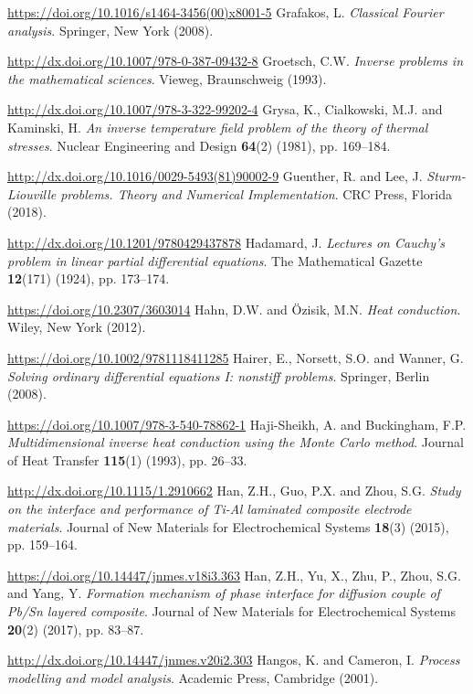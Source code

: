\begin{thebibliography}{301}
\url{https://doi.org/10.1016/s1464-3456(00)x8001-5}
%
%
 Grafakos, L. {\it Classical Fourier analysis}. Springer, New York (2008). 

\url{http://dx.doi.org/10.1007/978-0-387-09432-8}
%
%
 Groetsch, C.W. {\it Inverse problems in the mathematical sciences}. Vieweg, Braunschweig (1993). 

\url{http://dx.doi.org/10.1007/978-3-322-99202-4}
%
%
 Grysa, K., Cialkowski, M.J. and Kaminski, H. {\it An inverse temperature field problem of the theory of thermal stresses}. Nuclear Engineering and Design {\bf 64}(2) (1981), pp. 169--184.

\url{http://dx.doi.org/10.1016/0029-5493(81)90002-9}
%
%
 Guenther, R. and Lee, J. {\it Sturm-Liouville problems. Theory and Numerical Implementation}. CRC Press, Florida (2018). 

\url{http://dx.doi.org/10.1201/9780429437878}
%
%
 Hadamard, J. {\it Lectures on Cauchy's problem in linear partial differential equations}. The Mathematical Gazette {\bf 12}(171) (1924), pp. 173--174.

\url{https://doi.org/10.2307/3603014}
%
%
 Hahn, D.W. and \"Ozisik, M.N. {\it Heat conduction}. Wiley, New York (2012).

\url{https://doi.org/10.1002/9781118411285}
%
%
 Hairer, E., Norsett, S.O. and Wanner, G. {\it Solving ordinary differential equations I: nonstiff problems}. Springer, Berlin (2008).

\url{https://doi.org/10.1007/978-3-540-78862-1}
%
%
 Haji-Sheikh, A. and Buckingham, F.P. {\it Multidimensional inverse heat conduction using the Monte Carlo method}. Journal of Heat Transfer {\bf 115}(1) (1993), pp. 26--33.

\url{http://dx.doi.org/10.1115/1.2910662}
%
%
 Han, Z.H., Guo, P.X. and Zhou, S.G. {\it Study on the interface and performance of Ti-Al laminated composite electrode materials}. Journal of New Materials for Electrochemical Systems {\bf 18}(3) (2015), pp. 159--164.

\url{https://doi.org/10.14447/jnmes.v18i3.363}
%
%
 Han, Z.H., Yu, X., Zhu, P., Zhou, S.G. and Yang, Y. {\it Formation mechanism of phase interface for diffusion couple of Pb/Sn layered composite}. Journal of New Materials for Electrochemical Systems {\bf 20}(2) (2017), pp. 83--87.

\url{http://dx.doi.org/10.14447/jnmes.v20i2.303}
%
%
 Hangos, K. and Cameron, I. {\it Process modelling and model analysis}. Academic Press, Cambridge (2001).


\end{thebibliography}
